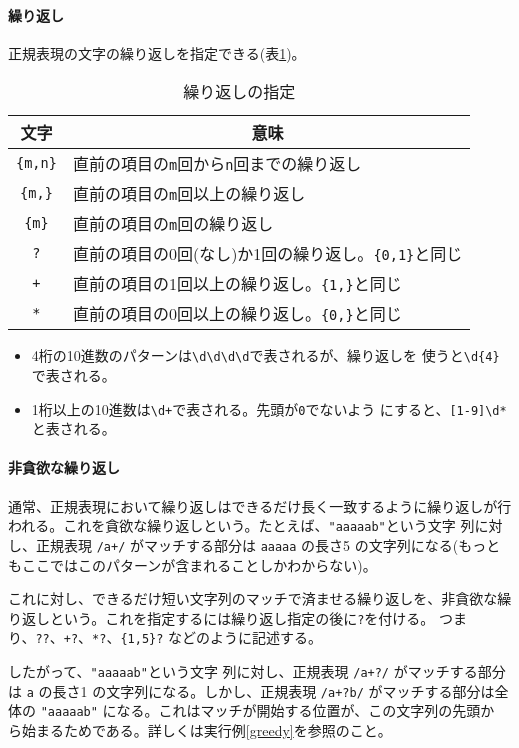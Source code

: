 \paragraph{繰り返し}
正規表現の文字の繰り返しを指定できる(表\ref{repeat})。
\begin{table}[ht]
\caption{繰り返しの指定}\label{repeat}
\begin{center}
 \begin{tabular}{|c|l|}\hline
  文字&\multicolumn{1}{c|}{意味}\\\hline
\Verb+{m,n}+&直前の項目の\texttt{m}回から\texttt{n}回までの繰り返し\\\hline
\Verb+{m,}+&直前の項目の\texttt{m}回以上の繰り返し\\\hline
\Verb+{m}+&直前の項目の\texttt{m}回の繰り返し\\\hline
\Verb+?+&直前の項目の0回(なし)か1回の繰り返し。\Verb+{0,1}+と同じ\\\hline
\Verb-+-&直前の項目の1回以上の繰り返し。\Verb+{1,}+と同じ\\\hline
\Verb+*+&直前の項目の0回以上の繰り返し。\Verb+{0,}+と同じ\\\hline
\end{tabular}
\end{center}
\end{table}
\begin{itemize}
 \item 4桁の10進数のパターンは\Verb+\d\d\d\d+で表されるが、繰り返しを
       使うと\Verb+\d{4}+で表される。
 \item 1桁以上の10進数は\Verb-\d+-で表される。先頭が\texttt{0}でないよう
       にすると、\Verb+[1-9]\d*+と表される。
\end{itemize}
\paragraph{非貪欲な繰り返し}
通常、正規表現において繰り返しはできるだけ長く一致するように繰り返しが行
われる。これを貪欲な繰り返しという。たとえば、\Verb+"aaaaab"+という文字
列に対し、正規表現 \Verb-/a+/- がマッチする部分は \Verb+aaaaa+ の長さ5
の文字列になる(もっともここではこのパターンが含まれることしかわからない)。

これに対し、できるだけ短い文字列のマッチで済ませる繰り返しを、非貪欲な繰
り返しという。これを指定するには繰り返し指定の後に\Verb+?+を付ける。
つまり、\Verb-??-、\Verb-+?-、\Verb-*?-、\Verb-{1,5}?- などのように記述する。

したがって、\Verb+"aaaaab"+という文字
列に対し、正規表現 {\Verb-/a+?/-} がマッチする部分は \Verb+a+ の長さ1
の文字列になる。しかし、正規表現 {\Verb-/a+?b/-} がマッチする部分は全体の
\Verb+"aaaaab"+ になる。これはマッチが開始する位置が、この文字列の先頭か
ら始まるためである。詳しくは実行例\ref{greedy}を参照のこと。

